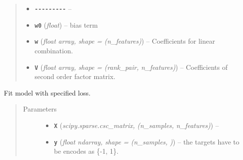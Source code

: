\documentclass[letterpaper,10pt,english]{sphinxmanual}
\begin{document}
\begin{fulllineitems}
\begin{quote}
\begin{description}
\begin{itemize}
\item {} 
\textbf{\texttt{-{-}-{-}-{-}-{-}-}} -- 

\item {} 
\textbf{\texttt{w0}} (\emph{float}) -- bias term

\item {} 
\textbf{\texttt{w}} (\emph{float \textbar{} array, shape = (n\_features)}) -- Coefficients for linear combination.

\item {} 
\textbf{\texttt{V}} (\emph{float \textbar{} array, shape = (rank\_pair, n\_features)}) -- Coefficients of second order factor matrix.

\end{itemize}

\end{description}\end{quote}

\begin{fulllineitems}
\label{api:fastFM.als.FMClassification.fit}
Fit model with specified loss.
\begin{quote}\begin{description}
\item[{Parameters}] \leavevmode\begin{itemize}
\item {} 
\textbf{\texttt{X}} (\emph{scipy.sparse.csc\_matrix, (n\_samples, n\_features)}) -- 

\item {} 
\textbf{\texttt{y}} (\emph{float \textbar{} ndarray, shape = (n\_samples, )}) -- the targets have to be encodes as \{-1, 1\}.

\end{itemize}

\end{description}\end{quote}

\end{fulllineitems}


\end{fulllineitems}

\end{document}
